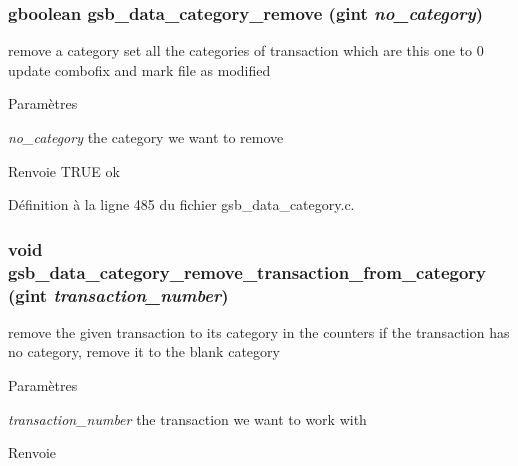 \subsubsection[{gsb\_\-data\_\-category\_\-remove}]{\setlength{\rightskip}{0pt plus 5cm}gboolean gsb\_\-data\_\-category\_\-remove (gint {\em no\_\-category})}\label{gsb__data__category_8h_a6c7a65577a171613fef900fc5f2a3bc3}
remove a category set all the categories of transaction which are this one to 0 update combofix and mark file as modified


\begin{DoxyParams}{Paramètres}
\item[{\em no\_\-category}]the category we want to remove\end{DoxyParams}
\begin{DoxyReturn}{Renvoie}
TRUE ok 
\end{DoxyReturn}


Définition à la ligne 485 du fichier gsb\_\-data\_\-category.c.

\subsubsection[{gsb\_\-data\_\-category\_\-remove\_\-transaction\_\-from\_\-category}]{\setlength{\rightskip}{0pt plus 5cm}void gsb\_\-data\_\-category\_\-remove\_\-transaction\_\-from\_\-category (gint {\em transaction\_\-number})}\label{gsb__data__category_8h_aa19788e0032e0cac0e125c478c5a3b06}
remove the given transaction to its category in the counters if the transaction has no category, remove it to the blank category


\begin{DoxyParams}{Paramètres}
\item[{\em transaction\_\-number}]the transaction we want to work with\end{DoxyParams}
\begin{DoxyReturn}{Renvoie}

\end{DoxyReturn}


